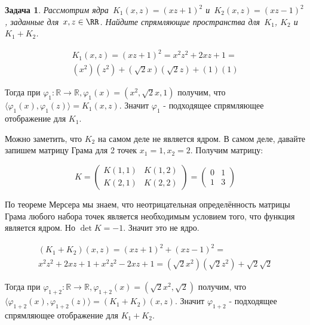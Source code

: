 \documentclass[12pt,fleqn]{article}
\newtheorem{esProblem}{Задача}
\begin{document}
\begin{esProblem}
    Рассмотрим ядра~$K_1(x, z) = (xz + 1)^2$ и~$K_2(x, z) = (xz - 1)^2$,
    заданные для~$x, z \in \RR$.
    Найдите спрямляющие пространства для~$K_1$, $K_2$ и~$K_1 + K_2$.
\end{esProblem}
\begin{esSolution}
    \begin{gather*}
        K_1(x, z) = (xz + 1)^2 = x^2 z^2 + 2xz + 1 = \\
        (x^2)(z^2) + (\sqrt{2}x)(\sqrt{2}z) + (1)(1)
    \end{gather*}

    Тогда при $\varphi_1\colon \mathbb{R} \to \mathbb{R}, \varphi_1(x) = (x^2, \sqrt{2}x, 1)$ получим, что $\langle \varphi_1(x), \varphi_1(z) \rangle = K_1(x, z)$. Значит $\varphi_1$ - подходящее спрямляющее отображение для $K_1$.
    
    Можно заметить, что $K_2$ на самом деле не является ядром. В самом деле, давайте запишем матрицу Грама для 2 точек $x_1 = 1, x_2 = 2$. Получим матрицу: 
    
    \begin{equation*}
    K = 
        \begin{pmatrix}
            K(1, 1) & K(1, 2) \\
            K(2, 1) & K(2, 2)
        \end{pmatrix}
        = 
        \begin{pmatrix}
            0 & 1 \\
            1 & 3 
        \end{pmatrix}
    \end{equation*}
    
    По теореме Мерсера мы знаем, что неотрицательная определённость матрицы Грама любого набора точек является необходимым условием того, что функция является ядром. Но $\det K = -1$. Значит это не ядро. 
    
    \begin{gather*}
        (K_1 + K_2)(x, z) = (xz + 1)^2 + (xz - 1)^2 =
        \\
        x^2 z^2 + 2xz + 1 + x^2 z^2 - 2xz + 1 = 
        (\sqrt{2}x^2)(\sqrt{2}z^2) + \sqrt{2}\sqrt{2}
    \end{gather*}
    
    Тогда при $\varphi_{1+2}\colon \mathbb{R} \to \mathbb{R}, \varphi_{1+2}(x) = (\sqrt{2}x^2, \sqrt{2})$ получим, что $\langle \varphi_{1+2}(x), \varphi_{1+2}(z) \rangle = (K_1 + K_2)(x, z)$. Значит $\varphi_{1+2}$ - подходящее спрямляющее отображение для $K_1 + K_2$.
\end{esSolution}
\end{document}
